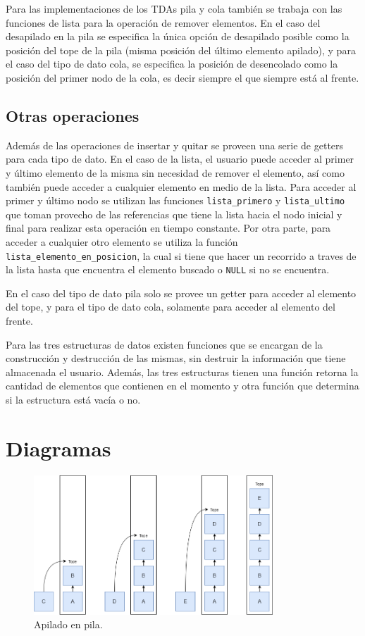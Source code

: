 \documentclass[titlepage,a4paper]{article}
\begin{document}
Para las implementaciones de los TDAs pila y cola también se trabaja con las funciones de lista para la operación de remover elementos. En el caso del desapilado en la pila se especifica la única opción de desapilado posible como la posición del tope de la pila (misma posición del último elemento apilado), y para el caso del tipo de dato cola, se especifica la posición de desencolado como la posición del primer nodo de la cola, es decir siempre el que siempre está al frente.

\subsection{Otras operaciones}

Además de las operaciones de insertar y quitar se proveen una serie de getters para cada tipo de dato. En el caso de la lista, el usuario puede acceder al primer y último elemento de la misma sin necesidad de remover el elemento, así como también puede acceder a cualquier elemento en medio de la lista. Para acceder al primer y último nodo se utilizan las funciones \lstinline{lista_primero} y \lstinline{lista_ultimo} que toman provecho de las referencias que tiene la lista hacia el nodo inicial y final para realizar esta operación en tiempo constante. Por otra parte, para acceder a cualquier otro elemento se utiliza la función \lstinline{lista_elemento_en_posicion}, la cual si tiene que hacer un recorrido a traves de la lista hasta que encuentra el elemento buscado o \lstinline{NULL} si no se encuentra.

En el caso del tipo de dato pila solo se provee un getter para acceder al elemento del tope, y para el tipo de dato cola, solamente para acceder al elemento del frente.

Para las tres estructuras de datos existen funciones que se encargan de la construcción y destrucción de las mismas, sin destruir la información que tiene almacenada el usuario. Además, las tres estructuras tienen una función retorna la cantidad de elementos que contienen en el momento y otra función que determina si la estructura está vacía o no.


\section{Diagramas}\label{sec:diagramas}

\begin{figure}[H]
\centering
\includegraphics[width=0.8\textwidth]{pila_apilado.png}
\caption{\label{fig:seq01}Apilado en pila.}
\end{figure}
\end{document}
